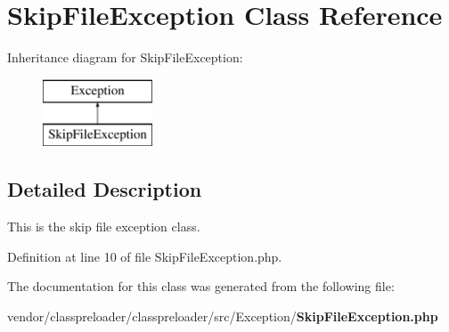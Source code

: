 \section{Skip\+File\+Exception Class Reference}
\label{class_class_preloader_1_1_exception_1_1_skip_file_exception}
Inheritance diagram for Skip\+File\+Exception\+:\begin{figure}[H]
\begin{center}
\leavevmode
\includegraphics[height=2.000000cm]{class_class_preloader_1_1_exception_1_1_skip_file_exception}
\end{center}
\end{figure}


\subsection{Detailed Description}
This is the skip file exception class. 

Definition at line 10 of file Skip\+File\+Exception.\+php.



The documentation for this class was generated from the following file\+:\begin{DoxyCompactItemize}
\item 
vendor/classpreloader/classpreloader/src/\+Exception/{\bf Skip\+File\+Exception.\+php}\end{DoxyCompactItemize}
